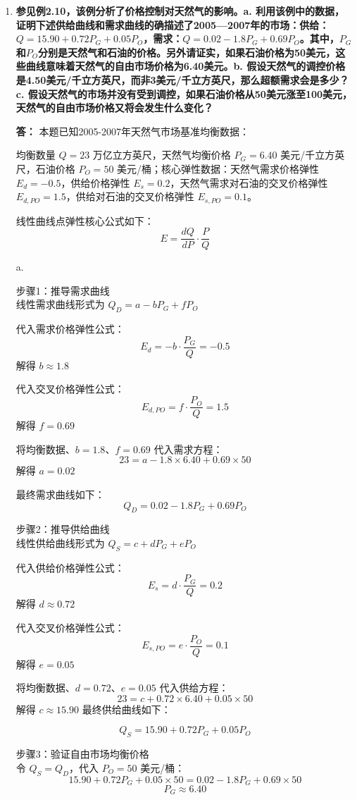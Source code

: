 \begin{enumerate}[label=\textbf{\arabic*.}, leftmargin=*]
			\item \textbf{参见例2.10，该例分析了价格控制对天然气的影响。a. 利用该例中的数据，证明下述供给曲线和需求曲线的确描述了2005—2007年的市场：供给：$Q=15.90+0.72P_G+0.05P_O$，需求：$Q=0.02-1.8P_G+0.69P_O$。其中，$P_G$和$P_O$分别是天然气和石油的价格。另外请证实，如果石油价格为50美元，这些曲线意味着天然气的自由市场价格为6.40美元。b. 假设天然气的调控价格是4.50美元/千立方英尺，而非3美元/千立方英尺，那么超额需求会是多少？c. 假设天然气的市场并没有受到调控，如果石油价格从50美元涨至100美元，天然气的自由市场价格又将会发生什么变化？}
			
			\textbf{答：}
			本题已知2005-2007年天然气市场基准均衡数据：
			
			均衡数量 $Q=23$ 万亿立方英尺，天然气均衡价格 $P_G=6.40$ 美元/千立方英尺，石油价格 $P_O=50$ 美元/桶；核心弹性数据：天然气需求价格弹性 $E_d=-0.5$，供给价格弹性 $E_s=0.2$，天然气需求对石油的交叉价格弹性 $E_{d,PO}=1.5$，供给对石油的交叉价格弹性 $E_{s,PO}=0.1$。
			
			线性曲线点弹性核心公式如下：
				$$E = \frac{dQ}{dP} \cdot \frac{P}{Q}$$
			
			a. 
			
			步骤1：推导需求曲线\\
			线性需求曲线形式为 $Q_D = a - bP_G + fP_O$
			
			代入需求价格弹性公式：
			$$E_d = -b \cdot \frac{P_G}{Q} = -0.5$$
			解得 $b \approx 1.8$
	
			代入交叉价格弹性公式：
			$$E_{d,PO} = f \cdot \frac{P_O}{Q} = 1.5$$
			解得 $f = 0.69$
			
			将均衡数据、$b=1.8$、$f=0.69$ 代入需求方程：
			$$23 = a - 1.8 \times 6.40 + 0.69 \times 50$$
			解得 $a = 0.02$
			
			最终需求曲线如下：
				$$Q_D = 0.02 - 1.8P_G + 0.69P_O$$
			
			\newpage
			步骤2：推导供给曲线\\
			线性供给曲线形式为 $Q_S = c + dP_G + eP_O$

			代入供给价格弹性公式：
			$$E_s = d \cdot \frac{P_G}{Q} = 0.2$$
			解得 $d \approx 0.72$
			
			代入交叉价格弹性公式：
			$$E_{s,PO} = e \cdot \frac{P_O}{Q} = 0.1$$
			解得 $e = 0.05$
			
			将均衡数据、$d=0.72$、$e=0.05$ 代入供给方程：
			$$23 = c + 0.72 \times 6.40 + 0.05 \times 50$$
			解得 $c \approx 15.90$
			最终供给曲线如下：

				$$Q_S = 15.90 + 0.72P_G + 0.05P_O$$
			
			步骤3：验证自由市场均衡价格\\
			令 $Q_S=Q_D$，代入 $P_O=50$ 美元/桶：
			$$15.90 + 0.72P_G + 0.05 \times 50 = 0.02 - 1.8P_G + 0.69 \times 50$$ 
			$$P_G \approx 6.40$$
			

\end{enumerate}

